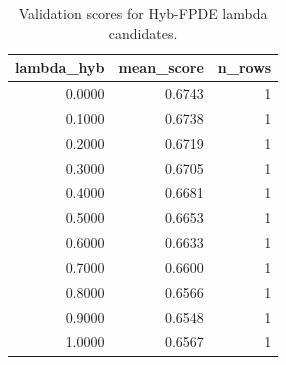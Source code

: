 \begin{table}[t]
\caption{Validation scores for Hyb-FPDE lambda candidates.}
\label{tab:lambda_distribution_computed}
\centering
\begin{tabular}{rrr}
\toprule
lambda\_hyb & mean\_score & n\_rows \\
\midrule
0.0000 & 0.6743 & 1 \\
0.1000 & 0.6738 & 1 \\
0.2000 & 0.6719 & 1 \\
0.3000 & 0.6705 & 1 \\
0.4000 & 0.6681 & 1 \\
0.5000 & 0.6653 & 1 \\
0.6000 & 0.6633 & 1 \\
0.7000 & 0.6600 & 1 \\
0.8000 & 0.6566 & 1 \\
0.9000 & 0.6548 & 1 \\
1.0000 & 0.6567 & 1 \\
\bottomrule
\end{tabular}

\end{table}
